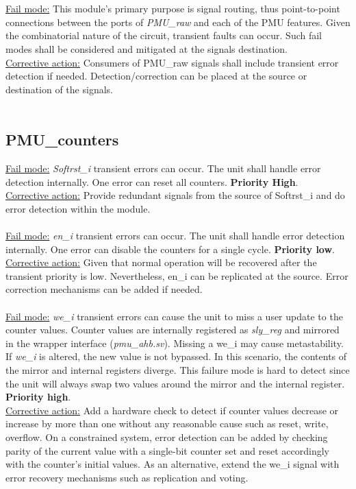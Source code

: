 \\
\\
\underline{Fail mode:} This module's primary purpose is signal routing, thus point-to-point connections between the ports of \textit{PMU\_raw} and each of the PMU features. Given the combinatorial nature of the circuit, transient faults can occur. Such fail modes shall be considered and mitigated at the signals destination.\\
\underline{Corrective action:} Consumers of PMU\_raw signals shall include transient error detection if needed. Detection/correction can be placed at the source or destination of the signals.\\
\\
\subsection{PMU\_counters}
\underline{Fail mode:} \textit{Softrst\_i} transient errors can occur. The unit shall handle error detection internally. One error can reset all counters. \textbf{Priority High}.\\
\underline{Corrective action:} Provide redundant signals from the source of Softrst\_i and do error detection within the module.\\
\\
\underline{Fail mode:} \textit{en\_i} transient errors can occur. The unit shall handle error detection internally. One error can disable the counters for a single cycle. \textbf{Priority low}.\\
\underline{Corrective action:} 
Given that normal operation will be recovered after the transient priority is low. Nevertheless, en\_i can be replicated at the source. Error correction mechanisms can be added if needed. \\
\\
\underline{Fail mode:} \textit{we\_i }transient errors can cause the unit to miss a user update to the counter values. Counter values are internally registered as \textit{sly\_reg} and mirrored in the wrapper interface (\textit{pmu\_ahb.sv}). Missing a we\_i may cause metastability. If \textit{we\_i} is altered, the new value is not bypassed. In this scenario, the contents of the mirror and internal registers diverge. This failure mode is hard to detect since the unit will always swap two values around the mirror and the internal register. \textbf{Priority high}.\\
\underline{Corrective action:}  Add a hardware check to detect if counter values decrease or increase by more than one without any reasonable cause such as reset, write, overflow. On a constrained system, error detection can be added by checking parity of the current value with a single-bit counter set and reset accordingly with the counter's initial values. As an alternative, extend the we\_i signal with error recovery mechanisms such as replication and voting.\\
\\

